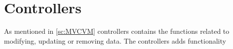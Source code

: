 \section{Controllers}
As mentioned in \autoref{sc:MVCVM} controllers contains the functions related to modifying, updating or removing data. The controllers adds functionality